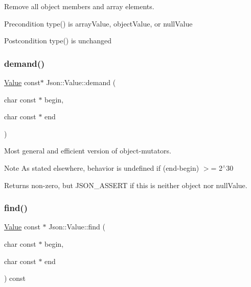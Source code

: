 Remove all object members and array elements. \begin{DoxyPrecond}{Precondition}
type() is array\+Value, object\+Value, or null\+Value 
\end{DoxyPrecond}
\begin{DoxyPostcond}{Postcondition}
type() is unchanged 
\end{DoxyPostcond}
\mbox{\label{class_json_1_1_value_afeb7ff596a0929d90c5f2f3cffb413ed}} 
\subsubsection{\texorpdfstring{demand()}{demand()}}
{\footnotesize\ttfamily \hyperlink{class_json_1_1_value}{Value} const$\ast$ Json\+::\+Value\+::demand (\begin{DoxyParamCaption}\item[{char const $\ast$}]{begin,  }\item[{char const $\ast$}]{end }\end{DoxyParamCaption})}

Most general and efficient version of object-\/mutators. \begin{DoxyNote}{Note}
As stated elsewhere, behavior is undefined if (end-\/begin) $>$= 2$^\wedge$30 
\end{DoxyNote}
\begin{DoxyReturn}{Returns}
non-\/zero, but J\+S\+O\+N\+\_\+\+A\+S\+S\+E\+RT if this is neither object nor null\+Value. 
\end{DoxyReturn}
\mbox{\label{class_json_1_1_value_afb007b9ce9b2cf9d5f667a07e5e0349f}} 
\subsubsection{\texorpdfstring{find()}{find()}}
{\footnotesize\ttfamily \hyperlink{class_json_1_1_value}{Value} const  $\ast$ Json\+::\+Value\+::find (\begin{DoxyParamCaption}\item[{char const $\ast$}]{begin,  }\item[{char const $\ast$}]{end }\end{DoxyParamCaption}) const}

